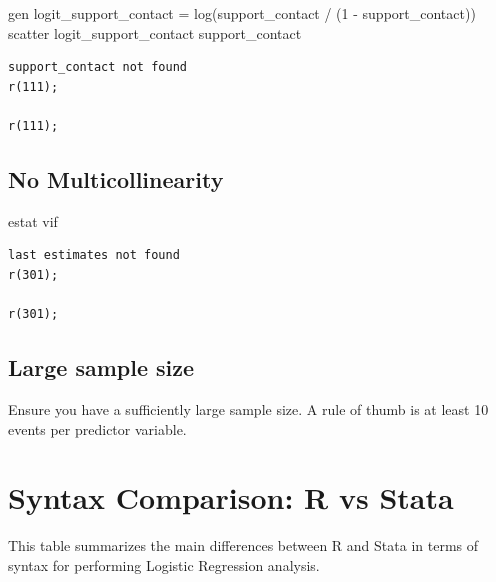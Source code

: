 \documentclass[
  letterpaper,
  DIV=11,
  numbers=noendperiod]{scrreprt}
\newenvironment{Shaded}{\begin{snugshade}}{\end{snugshade}}
\newcommand{\FunctionTok}[1]{\textcolor[rgb]{0.28,0.35,0.67}{#1}}
\newcommand{\KeywordTok}[1]{\textcolor[rgb]{0.00,0.23,0.31}{#1}}
\newcommand{\NormalTok}[1]{\textcolor[rgb]{0.00,0.23,0.31}{#1}}
\begin{document}
\begin{Shaded}
\begin{Highlighting}[]
\KeywordTok{gen}\NormalTok{ logit\_support\_contact = }\FunctionTok{log}\NormalTok{(support\_contact / (1 {-} support\_contact))}
\KeywordTok{scatter}\NormalTok{ logit\_support\_contact support\_contact}
\end{Highlighting}
\end{Shaded}

\begin{verbatim}
support_contact not found
r(111);

r(111);
\end{verbatim}

\subsection{No Multicollinearity}\label{no-multicollinearity-1}

\begin{Shaded}
\begin{Highlighting}[]
\KeywordTok{estat} \KeywordTok{vif}
\end{Highlighting}
\end{Shaded}

\begin{verbatim}
last estimates not found
r(301);

r(301);
\end{verbatim}

\subsection{Large sample size}\label{large-sample-size-1}

Ensure you have a sufficiently large sample size. A rule of thumb is at
least 10 events per predictor variable.

\section{Syntax Comparison: R vs
Stata}\label{syntax-comparison-r-vs-stata-1}

This table summarizes the main differences between R and Stata in terms
of syntax for performing Logistic Regression analysis.
\end{document}
